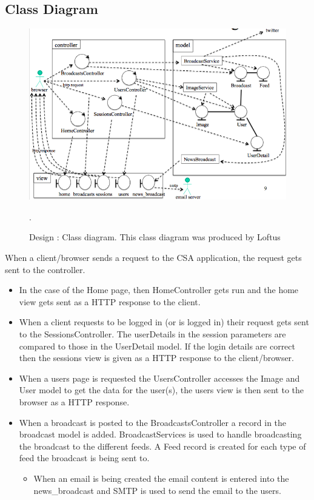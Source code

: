 \documentclass[10pt,a4paper,titlepage]{article}
\begin{document}
\subsection{Class Diagram}
\begin{figure}[H]
\begin{center}
\includegraphics[scale=0.55]{include/classDiagram.png}  
\caption{Design : Class diagram. This class diagram was produced by Loftus\cite[5]{design}}.
\label{fig:classDiagram}
\end{center}
\end{figure}
When a client/browser sends a request to the CSA application, the request gets sent to the controller. 
\begin{itemize}
\item In the case of the Home page, then HomeController gets run and the home view gets sent as a HTTP response to the client. 
\item When a client requests to be logged in (or is logged in) their request gets sent to the SessionsController. The userDetails in the session parameters are compared to those in the UserDetail model. If the login details are correct then the sessions view is given as a HTTP response to the client/browser. 
\item When a users page is requested the UsersController accesses the Image and User model to get the data for the user(s), the users view is then sent to the browser as a HTTP response. 
\item When a broadcast is posted to the BroadcastsController a record in the broadcast model is added. BroadcastServices is used to handle broadcasting the broadcast to the different feeds. A Feed record is created for each type of feed the broadcast is being sent to. 
	\begin{itemize}
	\item When an email is being created the email content is entered into the news\_broadcast and SMTP is used to send the email to the users.
	\end{itemize}
	
\end{itemize}
\end{document}
